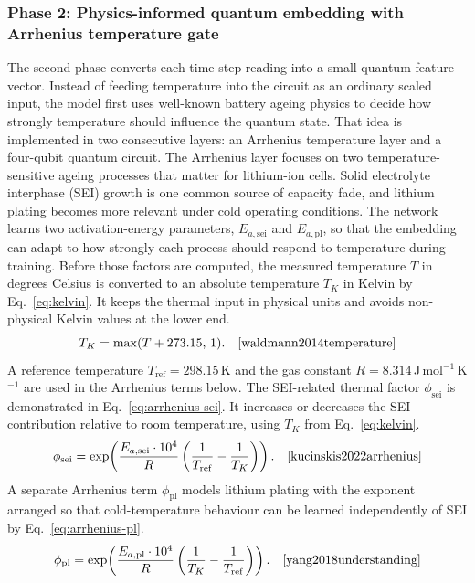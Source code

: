 \documentclass[a4paper,fleqn]{cas-sc}
\begin{document}
\subsubsection{Phase 2: Physics-informed quantum embedding with Arrhenius temperature gate}
The second phase converts each time-step reading into a small quantum feature vector. Instead of feeding temperature into the circuit as an ordinary scaled input, the model first uses well-known battery ageing physics to decide how strongly temperature should influence the quantum state. That idea is implemented in two consecutive layers: an Arrhenius temperature layer and a four-qubit quantum circuit. The Arrhenius layer focuses on two temperature-sensitive ageing processes that matter for lithium-ion cells. Solid electrolyte interphase (SEI) growth is one common source of capacity fade, and lithium plating becomes more relevant under cold operating conditions. The network learns two activation-energy parameters, $E_{a,\mathrm{sei}}$ and $E_{a,\mathrm{pl}}$, so that the embedding can adapt to how strongly each process should respond to temperature during training. Before those factors are computed, the measured temperature $T$ in degrees Celsius is converted to an absolute temperature $T_K$ in Kelvin by Eq.~\eqref{eq:kelvin}. It keeps the thermal input in physical units and avoids non-physical Kelvin values at the lower end.
\begin{equation}
T_K = \max(T + 273.15,\, 1). \quad \cite{waldmann2014temperature}
\label{eq:kelvin}
\end{equation}
A reference temperature $T_{\mathrm{ref}} = 298.15$\,K and the gas constant $R = 8.314$\,J\,mol$^{-1}$\,K$^{-1}$ are used in the Arrhenius terms below. The SEI-related thermal factor $\phi_{\mathrm{sei}}$ is demonstrated in Eq.~\eqref{eq:arrhenius-sei}. It increases or decreases the SEI contribution relative to room temperature, using $T_K$ from Eq.~\eqref{eq:kelvin}. 
\begin{equation}
\phi_{\mathrm{sei}} = \exp\!\left(\frac{E_{a,\mathrm{sei}} \cdot 10^{4}}{R}\left(\frac{1}{T_{\mathrm{ref}}} - \frac{1}{T_K}\right)\right). \quad \cite{kucinskis2022arrhenius}
\label{eq:arrhenius-sei}
\end{equation}
A separate Arrhenius term $\phi_{\mathrm{pl}}$ models lithium plating with the exponent arranged so that cold-temperature behaviour can be learned independently of SEI by Eq.~\eqref{eq:arrhenius-pl}.
\begin{equation}
\phi_{\mathrm{pl}} = \exp\!\left(\frac{E_{a,\mathrm{pl}} \cdot 10^{4}}{R}\left(\frac{1}{T_K} - \frac{1}{T_{\mathrm{ref}}}\right)\right). \quad \cite{yang2018understanding}
\label{eq:arrhenius-pl}
\end{equation}
\end{document}
